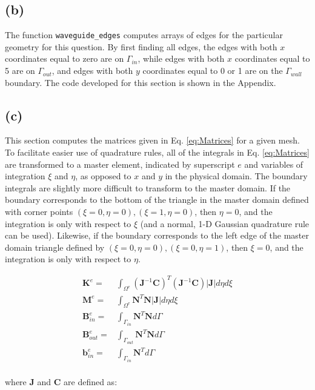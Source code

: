 \documentclass[10pt]{article}
\newcommand{\beqa}{\begin{equation}\begin{aligned}}
\newcommand{\eeqa}{\end{aligned}\end{equation}}
\begin{document}
\subsection{(b)}

The function {\tt waveguide\_edges} computes arrays of edges for the particular geometry for this question. By first finding all edges, the edges with both \(x\) coordinates equal to zero are on \(\Gamma_{in}\), while edges with both \(x\) coordinates equal to 5 are on \(\Gamma_{out}\), and edges with both \(y\) coordinates equal to 0 or 1 are on the \(\Gamma_{wall}\) boundary. The code developed for this section is shown in the Appendix.

\subsection{(c)}

This section computes the matrices given in Eq. \eqref{eq:Matrices} for a given mesh. To facilitate easier use of quadrature rules, all of the integrals in Eq. \eqref{eq:Matrices} are transformed to a master element, indicated by superscript \(e\) and variables of integration \(\xi\) and \(\eta\), as opposed to \(x\) and \(y\) in the physical domain. The boundary integrals are slightly more difficult to transform to the master domain. If the boundary corresponds to the bottom of the triangle in the master domain defined with corner points \((\xi=0,\eta=0), (\xi=1,\eta=0)\), then \(\eta=0\), and the integration is only with respect to \(\xi\) (and a normal, 1-D Gaussian quadrature rule can be used). Likewise, if the boundary corresponds to the left edge of the master domain triangle defined by \((\xi=0,\eta=0), (\xi=0,\eta=1)\), then \(\xi=0\), and the integration is only with respect to \(\eta\). 

\beqa
\label{eq:Matrices}
\textbf{K}^e=&\int_{\Omega^e}(\textbf{J}^{-1}\textbf{C})^T(\textbf{J}^{-1}\textbf{C})|\textbf{J}|d\eta d\xi\\
\textbf{M}^e=&\int_{\Omega^e}\textbf{N}^T\textbf{N}|\textbf{J}|d\eta d\xi\\
\textbf{B}_{in}^e=&\int_{\Gamma_{in}}\textbf{N}^T\textbf{N}d\Gamma\\
\textbf{B}_{out}^e=&\int_{\Gamma_{out}}\textbf{N}^T\textbf{N}d\Gamma\\
\textbf{b}_{in}^e=&\int_{\Gamma_{in}}\textbf{N}^Td\Gamma\\
\eeqa

where \textbf{J} and \textbf{C} are defined as:
\end{document}
